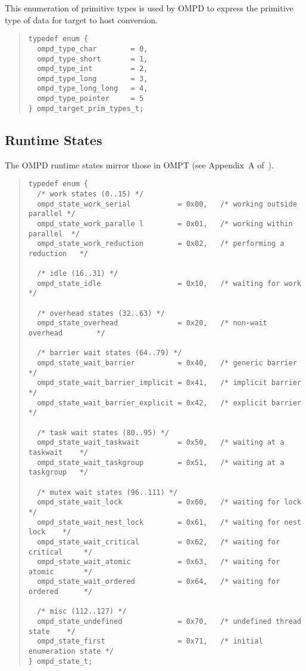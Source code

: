 This enumeration of primitive types is used by OMPD to express the primitive
type of data for target to host conversion.

\begin{quote}
\begin{lstlisting}
typedef enum {
  ompd_type_char        = 0,
  ompd_type_short       = 1,
  ompd_type_int         = 2,
  ompd_type_long        = 3,
  ompd_type_long_long   = 4,
  ompd_type_pointer     = 5
} ompd_target_prim_types_t;
\end{lstlisting}
\end{quote}

\subsection{Runtime States}

The OMPD runtime states mirror those in OMPT (see Appendix~A
of~\cite{ompt-tr2}).

\begin{quote}
\begin{lstlisting}
typedef enum {
  /* work states (0..15) */
  ompd_state_work_serial           = 0x00,   /* working outside parallel */
  ompd_state_work_paralle l        = 0x01,   /* working within parallel  */
  ompd_state_work_reduction        = 0x02,   /* performing a reduction   */

  /* idle (16..31) */
  ompd_state_idle                  = 0x10,   /* waiting for work         */

  /* overhead states (32..63) */
  ompd_state_overhead              = 0x20,   /* non-wait overhead        */

  /* barrier wait states (64..79) */
  ompd_state_wait_barrier          = 0x40,   /* generic barrier          */
  ompd_state_wait_barrier_implicit = 0x41,   /* implicit barrier         */
  ompd_state_wait_barrier_explicit = 0x42,   /* explicit barrier         */

  /* task wait states (80..95) */
  ompd_state_wait_taskwait         = 0x50,   /* waiting at a taskwait    */
  ompd_state_wait_taskgroup        = 0x51,   /* waiting at a taskgroup   */

  /* mutex wait states (96..111) */
  ompd_state_wait_lock             = 0x60,   /* waiting for lock         */
  ompd_state_wait_nest_lock        = 0x61,   /* waiting for nest lock    */  
  ompd_state_wait_critical         = 0x62,   /* waiting for critical     */
  ompd_state_wait_atomic           = 0x63,   /* waiting for atomic       */
  ompd_state_wait_ordered          = 0x64,   /* waiting for ordered      */

  /* misc (112..127) */
  ompd_state_undefined             = 0x70,   /* undefined thread state    */
  ompd_state_first                 = 0x71,   /* initial enumeration state */
} ompd_state_t;
\end{lstlisting}
\end{quote}

